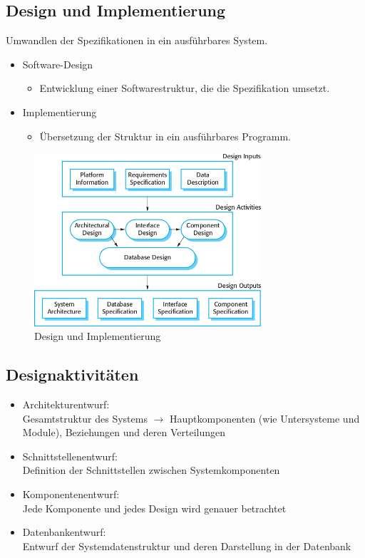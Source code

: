 \subsection{Design und Implementierung}
Umwandlen der Spezifikationen in ein ausführbares System.
\begin{itemize}
\item Software-Design
    \begin{itemize}
        \item  Entwicklung einer Softwarestruktur, die die Spezifikation umsetzt.
    \end{itemize}
\item Implementierung
    \begin{itemize}
        \item Übersetzung der Struktur in ein ausführbares Programm.
    \end{itemize}
\end{itemize}
\begin{figure}[h] 
  \centering
     \includegraphics[width=0.75\textwidth]{mainmatter/pics/entw_impl.png}
  \caption{Design und Implementierung}
\end{figure}

\subsection{Designaktivitäten
}
\begin{itemize}
    \item Architekturentwurf:\\
    Gesamtstruktur des Systems $\rightarrow$ Hauptkomponenten (wie Untersysteme und Module), Beziehungen und deren Verteilungen
    \item Schnittstellenentwurf:\\
    Definition der Schnittstellen zwischen Systemkomponenten
    \item Komponentenentwurf:\\
    Jede Komponente und jedes Design wird genauer betrachtet
    \item Datenbankentwurf:\\
    Entwurf der Systemdatenstruktur und deren Darstellung in der Datenbank
\end{itemize}
